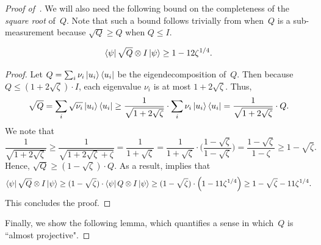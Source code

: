 \begin{proof}[Proof of~]
We will also need the following bound on the completeness of the \emph{square root} of~$Q$.
Note that such a bound follows trivially from 
when~$Q$ is a sub-measurement because $\sqrt{Q} \geq Q$ when $Q \leq I$.

\begin{lemma}\label{lem:sqrt-Q-completeness}
\begin{equation*}
\bra{\psi} \sqrt{Q} \otimes I \ket{\psi}
\geq 1 - 12 \zeta^{1/4}.
\end{equation*}
\end{lemma}
\begin{proof}
Let $Q = \sum_i \nu_i \ket{u_i} \bra{u_i}$ be the eigendecomposition of~$Q$.
Then because $Q \leq (1 + 2\sqrt{\zeta}) \cdot I$, each eigenvalue $\nu_i$ is at most $1+2\sqrt{\zeta}$.
Thus,
\begin{equation*}
\sqrt{Q}
= \sum_i \sqrt{\nu_i} \ket{u_i}\bra{u_i}
\geq \frac{1}{\sqrt{1 + 2\sqrt{\zeta}}} \cdot \sum_i \nu_i \ket{u_i}\bra{u_i}
= \frac{1}{\sqrt{1 + 2\sqrt{\zeta}}} \cdot Q.
\end{equation*}
We note that
\begin{equation*}
\frac{1}{\sqrt{1 + 2\sqrt{\zeta}}}
\geq \frac{1}{\sqrt{1 + 2\sqrt{\zeta} + \zeta}}
= \frac{1}{1 + \sqrt{\zeta}}
= \frac{1}{1 + \sqrt{\zeta}} \cdot \Big(\frac{1-\sqrt{\zeta}}{1-\sqrt{\zeta}}\Big)
= \frac{1-\sqrt{\zeta}}{1 - \zeta}
\geq 1 - \sqrt{\zeta}.
\end{equation*}
Hence, $\sqrt{Q} \geq (1-\sqrt{\zeta}) \cdot Q$.
As a result,  implies that
\begin{equation*}
\bra{\psi} \sqrt{Q} \otimes I \ket{\psi}
\geq (1-\sqrt{\zeta}) \cdot\bra{\psi} Q \otimes I \ket{\psi}
\geq (1-\sqrt{\zeta}) \cdot \left(1 - 11 \zeta^{1/4}\right)
\geq 1 -\sqrt{\zeta} - 11 \zeta^{1/4}.
\end{equation*}
This concludes the proof.
\end{proof}

Finally, we show the following lemma,
which quantifies a sense in which~$Q$ is ``almost projective".


\end{proof}
